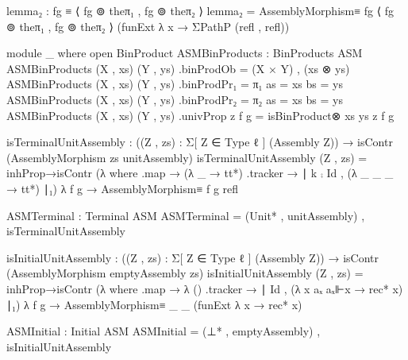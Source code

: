                              lemma₂ : fg ≡ ⟨ fg ⊚ theπ₁ , fg ⊚ theπ₂ ⟩
                             lemma₂ = AssemblyMorphism≡
                                      fg
                                      ⟨ fg ⊚ theπ₁ , fg ⊚ theπ₂ ⟩
                                      (funExt λ x → ΣPathP (refl , refl))

  module _ where
    open BinProduct
    ASMBinProducts : BinProducts ASM
    ASMBinProducts (X , xs) (Y , ys) .binProdOb = (X × Y) , (xs ⊗ ys)
    ASMBinProducts (X , xs) (Y , ys) .binProdPr₁ = π₁ {as = xs} {bs = ys}
    ASMBinProducts (X , xs) (Y , ys) .binProdPr₂ = π₂ {as = xs} {bs = ys}
    ASMBinProducts (X , xs) (Y , ys) .univProp {z} f g = isBinProduct⊗ xs ys z f g

  isTerminalUnitAssembly : ((Z , zs) : Σ[ Z ∈ Type ℓ ] (Assembly Z)) →  isContr (AssemblyMorphism zs unitAssembly)
  isTerminalUnitAssembly (Z , zs) =
                         inhProp→isContr (λ where
                                            .map → (λ _ → tt*)
                                            .tracker → ∣ k ⨾ Id , (λ _ _ _ → tt*) ∣₁)
                                          λ f g → AssemblyMorphism≡ f g refl

  ASMTerminal : Terminal ASM
  ASMTerminal = (Unit* , unitAssembly) , isTerminalUnitAssembly

  isInitialUnitAssembly : ((Z , zs) : Σ[ Z ∈ Type ℓ ] (Assembly Z)) → isContr (AssemblyMorphism emptyAssembly zs)
  isInitialUnitAssembly (Z , zs) =
                        inhProp→isContr (λ where
                                           .map → λ () 
                                           .tracker →  ∣ Id , (λ x aₓ aₓ⊩x → rec* x) ∣₁)
                                         λ f g → AssemblyMorphism≡ _ _ (funExt λ x → rec* x)

  ASMInitial : Initial ASM
  ASMInitial = (⊥* , emptyAssembly) , isInitialUnitAssembly

